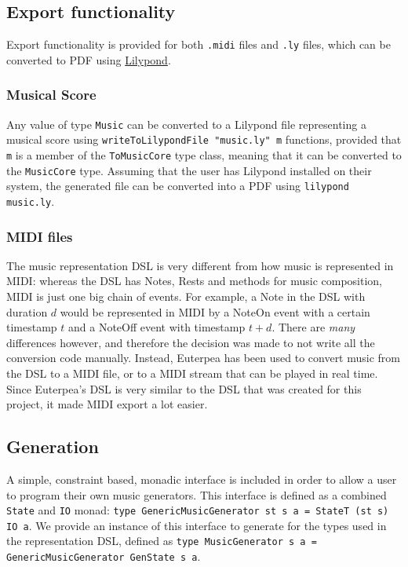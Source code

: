 \documentclass[11pt,a4paper]{article}
\newcommand{\icode}[1]{\texttt{#1}}
\begin{document}
\subsection{Export functionality}
Export functionality is provided for both \texttt{.midi} files and \texttt{.ly} files, which can be converted to PDF using \href{https://lilypond.org}{Lilypond}.

\subsubsection{Musical Score}
Any value of type \icode{Music} can be converted to a Lilypond file representing a musical score using \icode{writeToLilypondFile "music.ly" m} functions, provided that \icode{m} is a member of the \icode{ToMusicCore} type class, meaning that it can be converted to the \icode{MusicCore} type. Assuming that the user has Lilypond installed on their system, the generated file can be converted into a PDF using \icode{lilypond music.ly}.

\subsubsection{MIDI files}
The music representation DSL is very different from how music is represented in MIDI: whereas the DSL has Notes, Rests and methods for music composition, MIDI is just one big chain of events. For example, a Note in the DSL with duration $d$ would be represented in MIDI by a NoteOn event with a certain timestamp $t$ and a NoteOff event with timestamp $t+d$. There are \emph{many} differences however, and therefore the decision was made to not write all the conversion code manually. Instead, Euterpea has been used to convert music from the DSL to a MIDI file, or to a MIDI stream that can be played in real time. Since Euterpea's DSL is very similar to the DSL that was created for this project, it made MIDI export a lot easier.

\subsection{Generation}
A simple, constraint based, monadic interface is included in order to allow a user to program their own music generators. This interface is defined as a combined \icode{State} and \icode{IO} monad: \icode{type GenericMusicGenerator st s a = StateT (st s) IO a}. We provide an instance of this interface to generate for the types used in the representation DSL, defined as \icode{type MusicGenerator s a = GenericMusicGenerator GenState s a}.
\end{document}
